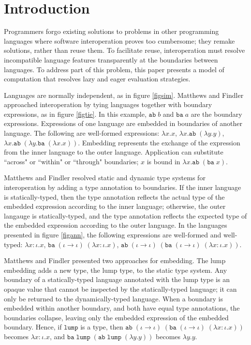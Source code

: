 \section{Introduction}

Programmers forgo existing solutions to problems in other programming languages where software interoperation proves too cumbersome; they remake solutions, rather than reuse them. To facilitate reuse, interoperation must resolve incompatible language features transparently at the boundaries between languages. To address part of this problem, this paper presents a model of computation that resolves lazy and eager evaluation strategies.

Languages are normally independent, as in figure \ref{figsim}. Matthews and Findler \cite{matthews07} approached interoperation by tying languages together with boundary expressions, as in figure \ref{figtie}. In this example, $\mathtt{ab} \; b$ and $\mathtt{ba} \; a$ are the boundary expressions. Expressions of one language are embedded in boundaries of another language. The following are well-formed expressions: $\lambda x.x$, $\lambda x.\mathtt{ab} \; (\lambda y.y)$, $\lambda x.\mathtt{ab} \; (\lambda y.\mathtt{ba} \; (\lambda x.x))$. Embedding represents the exchange of the expression from the inner language to the outer language. Application can substitute ``across" or ``within" or ``through" boundaries; $x$ is bound in $\lambda x.\mathtt{ab} \; (\mathtt{ba} \; x)$.

Matthews and Findler resolved static and dynamic type systems for interoperation by adding a type annotation to boundaries. If the inner language is statically-typed, then the type annotation reflects the actual type of the embedded expression according to the inner language; otherwise, the outer langauge is statically-typed, and the type annotation reflects the expected type of the embedded expression according to the outer language. In the languages presented in figure \ref{figann}, the following expressions are well-formed and well-typed: $\lambda x:\iota.x$, $\mathtt{ba} \; (\iota \rightarrow \iota) \; (\lambda x:\iota.x)$, $\mathtt{ab} \; (\iota \rightarrow \iota) \; (\mathtt{ba} \; (\iota \rightarrow \iota) \; (\lambda x:\iota.x))$.

Matthews and Findler presented two approaches for embedding. The lump embedding adds a new type, the lump type, to the static type system. Any boundary of a statically-typed language annotated with the lump type is an opaque value that cannot be inspected by the statically-typed language; it can only be returned to the dynamically-typed language. When a boundary is embedded within another boundary, and both have equal type annotations, the boundaries collapse, leaving only the embedded expression of the embedded boundary. Hence, if $\mathtt{lump}$ is a type, then $\mathtt{ab} \; (\iota \rightarrow \iota) \; (\mathtt{ba} \; (\iota \rightarrow \iota) \; (\lambda x:\iota.x))$ becomes $\lambda x:\iota.x$, and $\mathtt{ba} \; \mathtt{lump} \; (\mathtt{ab} \; \mathtt{lump} \; (\lambda y.y))$ becomes $\lambda y.y$.

